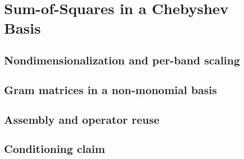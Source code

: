 
\section{Sum-of-Squares in a Chebyshev Basis}
\label{apx:chebyshev}

\subsection{Nondimensionalization and per-band scaling}
\label{sub:apx_scaling}

\subsection{Gram matrices in a non-monomial basis}
\label{sub:apx_gram_basis}

\subsection{Assembly and operator reuse}
\label{sub:apx_assembly}

\subsection{Conditioning claim}
\label{sub:apx_chebyshev_conditioning}

